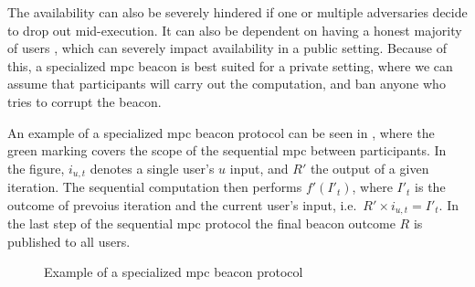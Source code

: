 The availability can also be severely hindered if one or multiple adversaries decide to drop out mid-execution. It can also be dependent on having a honest majority of users \cite{cascudo2017scrape}, which can severely impact availability in a public setting. 
Because of this, a specialized \gls{mpc} beacon is best suited for a private setting, where we can assume that participants will carry out the computation, and ban anyone who tries to corrupt the beacon.

An example of a specialized \gls{mpc} beacon protocol can be seen in , where the green marking covers the scope of the sequential \gls{mpc} between participants.
In the figure, $i_{u,t}$ denotes a single user's $u$ input, and $R'$ the output of a given iteration.
The sequential computation then performs $f'(I'_t)$, where $I'_t$ is the outcome of prevoius iteration and the current user's input, i.e.\ $R' \times i_{u,t} = I'_t$.
In the last step of the sequential \gls{mpc} protocol the final beacon outcome $R$ is published to all users.

\begin{figure}[htb]
    \centering
    \footnotesize
    \caption{Example of a specialized \gls{mpc} beacon protocol}\label{fig:mpc_beacon}
\end{figure}



